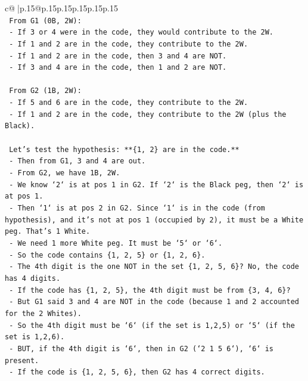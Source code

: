 \documentclass{article}
\begin{document}
{\begin{supertabular}{c@{$\;$}|p{.15\linewidth}@{}p{.15\linewidth}p{.15\linewidth}p{.15\linewidth}p{.15\linewidth}p{.15\linewidth}}
{{{\\ 
\texttt{    From G1 (0B, 2W):} \\
\texttt{    {-} If 3 or 4 were in the code, they would contribute to the 2W.} \\
\texttt{    {-} If 1 and 2 are in the code, they contribute to the 2W.} \\
\texttt{    {-} If 1 and 2 are in the code, then 3 and 4 are NOT.} \\
\texttt{    {-} If 3 and 4 are in the code, then 1 and 2 are NOT.} \\
\\ 
\texttt{    From G2 (1B, 2W):} \\
\texttt{    {-} If 5 and 6 are in the code, they contribute to the 2W.} \\
\texttt{    {-} If 1 and 2 are in the code, they contribute to the 2W (plus the Black).} \\
\\ 
\texttt{    Let's test the hypothesis: **\{1, 2\} are in the code.**} \\
\texttt{    {-} Then from G1, 3 and 4 are out.} \\
\texttt{    {-} From G2, we have 1B, 2W.} \\
\texttt{    {-} We know `2` is at pos 1 in G2. If `2` is the Black peg, then `2` is at pos 1.} \\
\texttt{    {-} Then `1` is at pos 2 in G2. Since `1` is in the code (from hypothesis), and it's not at pos 1 (occupied by 2), it must be a White peg. That's 1 White.} \\
\texttt{    {-} We need 1 more White peg. It must be `5` or `6`.} \\
\texttt{    {-} So the code contains \{1, 2, 5\} or \{1, 2, 6\}.} \\
\texttt{    {-} The 4th digit is the one NOT in the set \{1, 2, 5, 6\}? No, the code has 4 digits.} \\
\texttt{    {-} If the code has \{1, 2, 5\}, the 4th digit must be from \{3, 4, 6\}?} \\
\texttt{    {-} But G1 said 3 and 4 are NOT in the code (because 1 and 2 accounted for the 2 Whites).} \\
\texttt{    {-} So the 4th digit must be `6` (if the set is 1,2,5) or `5` (if the set is 1,2,6).} \\
\texttt{    {-} BUT, if the 4th digit is `6`, then in G2 (`2 1 5 6`), `6` is present.} \\
\texttt{    {-} If the code is \{1, 2, 5, 6\}, then G2 has 4 correct digits.} \\
}}}
\end{supertabular}}
\end{document}
